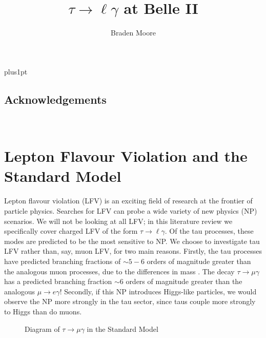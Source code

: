 \documentclass[12pt]{thesis}  %
\title{$\tau\to\ell\gamma$ at Belle II }   %
\author{Braden Moore}             %
\newcommand{\tmg}{\tau\to\mu\gamma}
\newcommand{\tlg}{\tau\to\ell\gamma}
\begin{document}
\baselineskip=18pt plus1pt

\setcounter{secnumdepth}{3}
\setcounter{tocdepth}{3}

\pagestyle{empty}
\maketitle                  %


\pagestyle{plain}
\begin{romanpages}
\tableofcontents

\chapter*{Acknowledgements}

~~

\end{romanpages}


\chapter{Lepton Flavour Violation and the Standard Model}

Lepton flavour violation (LFV) is an exciting field of research at the frontier of particle physics. Searches for LFV can probe a wide variety of new physics (NP) scenarios. We will not be looking at all LFV; in this literature review we specifically cover charged LFV of the form $\tlg$. Of the tau processes, these modes are predicted to be the most sensitive to NP. We choose to investigate tau LFV rather than, say, muon LFV, for two main reasons. Firstly, the tau processes have predicted branching fractions of $\sim 5 - 6$ orders of magnitude greater than the analogous muon processes, due to the differences in mass \cite{Paradisi:2016}. The decay $\tmg$ has a predicted branching fraction $\sim 6$ orders of magnitude greater than the analogous $\mu\to e \gamma$! Secondly, if this NP introduces Higgs-like particles, we would observe the NP more strongly in the tau sector, since taus couple more strongly to Higgs than do muons.

\begin{figure}[h]
\centering
\caption{Diagram of $\tmg$ in the Standard Model}
\label{}
\end{figure}
\end{document}
